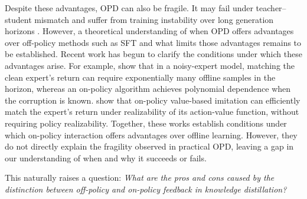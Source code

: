 \documentclass[11pt]{article}
\begin{document}
Despite these advantages, OPD can also be fragile. It may fail under teacher--student mismatch and suffer from training instability over long generation horizons \citep{li2026rethinking}. However, a theoretical understanding of when OPD offers advantages over off-policy methods such as SFT and what limits those advantages remains to be established. Recent work has begun to clarify the conditions under which these advantages arise. For example, \citet{sriraman2026behavior} show that in a noisy-expert model, matching the clean expert's return can require exponentially many offline samples in the horizon, whereas an on-policy algorithm achieves polynomial dependence when the corruption is known. \citet{viano2026interaction} show that on-policy value-based imitation can efficiently match the expert's return under realizability of its action-value function, without requiring policy realizability. Together, these works establish conditions under which on-policy interaction offers advantages over offline learning. However, they do not directly explain the fragility observed in practical OPD, leaving a gap in our understanding of when and why it succeeds or fails.

This naturally raises a question: \emph{What are the pros and cons caused by the distinction between off-policy and on-policy feedback in knowledge distillation?}
\end{document}
